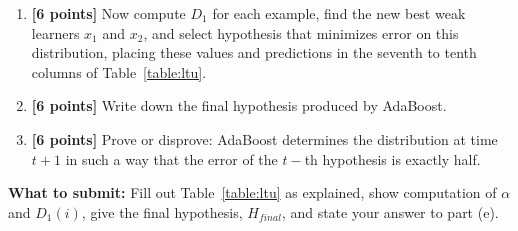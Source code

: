 \begin{enumerate}
\begin{enumerate}
   \item {\bf [6 points]} Now compute $D_1$ for each example, find the new best weak learners $x_1$ and $x_2$, and select hypothesis that
    minimizes error on this distribution, placing these values and
    predictions in the seventh to tenth columns of Table~\ref{table:ltu}.

  \item {\bf [6 points]} Write down the final hypothesis produced by AdaBoost.

  \item {\bf [6 points]} Prove or disprove: AdaBoost determines
    the distribution at time $t+1$ in such a way that the error of the $t-$th hypothesis
    is exactly half.

%
%
%

\end{enumerate}

\textbf{What to submit:} Fill out Table~\ref{table:ltu} as explained, show computation of $\alpha$ and $D_1(i)$, give the final hypothesis, $H_{\textit{final}}$, and state your answer to part (e).



\end{enumerate}
